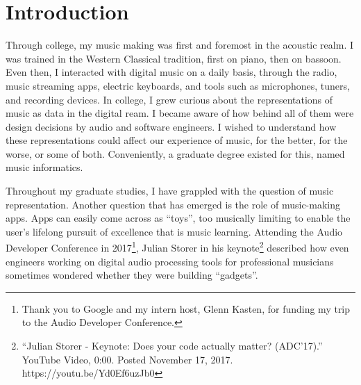 \chapter{Introduction}
\label{chap:thesis-intro}
Through college, my music making was first and foremost in the acoustic realm. I was trained in the Western Classical tradition, first on piano, then on bassoon. Even then, I interacted with digital music on a daily basis, through the radio, music streaming apps, electric keyboards, and tools such as microphones, tuners, and recording devices. In college, I grew curious about the representations of music as data in the digital ream. I became aware of how behind all of them were design decisions by audio and software engineers. I wished to understand how these representations could affect our experience of music, for the better, for the worse, or some of both. Conveniently, a graduate degree existed for this, named music informatics. 

Throughout my graduate studies, I have grappled with the question of music representation. Another question that has emerged is the role of music-making apps. Apps can easily come across as ``toys'', too musically limiting to enable the user's lifelong pursuit of excellence that is music learning. Attending the Audio Developer Conference in 2017\footnote{Thank you to Google and my intern host, Glenn Kasten, for funding my trip to the Audio Developer Conference.}, Julian Storer in his keynote\footnote{``Julian Storer - Keynote: Does your code actually matter? (ADC’17).'' YouTube Video, 0:00. Posted November 17, 2017. https://youtu.be/Yd0Ef6uzJb0} described how even engineers working on digital audio processing tools for professional musicians sometimes wondered whether they were building ``gadgets''. 

